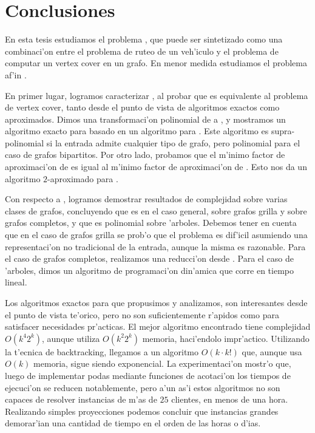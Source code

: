 \chapter{Conclusiones}

En esta tesis estudiamos el problema , que puede ser sintetizado como una combinaci'on entre el problema de ruteo de un veh'iculo y el problema de computar un vertex cover en un grafo. En menor medida estudiamos el problema af'in .

En primer lugar, logramos caracterizar , al probar que es equivalente al problema de vertex cover, tanto desde el punto de vista de algoritmos exactos como aproximados. Dimos una transformaci'on polinomial de  a , y mostramos un algoritmo exacto para  basado en un algoritmo para . Este algoritmo es supra-polinomial si la entrada admite cualquier tipo de grafo, pero polinomial para el caso de grafos bipartitos. Por otro lado, probamos que el m'inimo factor de aproximaci'on de  es igual al m'inimo factor de aproximaci'on de . Esto nos da un algoritmo $2$-aproximado para .

Con respecto a , logramos demostrar resultados de complejidad sobre varias clases de grafos, concluyendo que es  en el caso general, sobre grafos grilla y sobre grafos completos, y que es polinomial sobre 'arboles. Debemos tener en cuenta que en el caso de grafos grilla se prob'o que el problema es dif'icil asumiendo una representaci'on no tradicional de la entrada, aunque la misma es razonable.  Para el caso de grafos completos, realizamos una reducci'on desde . Para el caso de 'arboles, dimos un algoritmo de programaci'on din'amica que corre en tiempo lineal.

Los algoritmos exactos para  que propusimos y analizamos, son interesantes desde el punto de vista te'orico, pero no son suficientemente r'apidos como para satisfacer necesidades pr'acticas. El mejor algoritmo encontrado tiene complejidad $O(k^4 2^k)$, aunque utiliza $O(k^2 2^k)$ memoria, haci'endolo impr'actico. Utilizando la t'ecnica de backtracking, llegamos a un algoritmo $O(k \cdot k!)$ que, aunque usa $O(k)$ memoria, sigue siendo exponencial. La experimentaci'on mostr'o que, luego de implementar podas mediante funciones de acotaci'on los tiempos de ejecuci'on se reducen notablemente, pero a'un as'i estos algoritmos no son capaces de resolver instancias de m'as de $25$ clientes, en menos de una hora. Realizando simples proyecciones podemos concluir que instancias grandes demorar'ian una cantidad de tiempo en el orden de las horas o d'ias.

